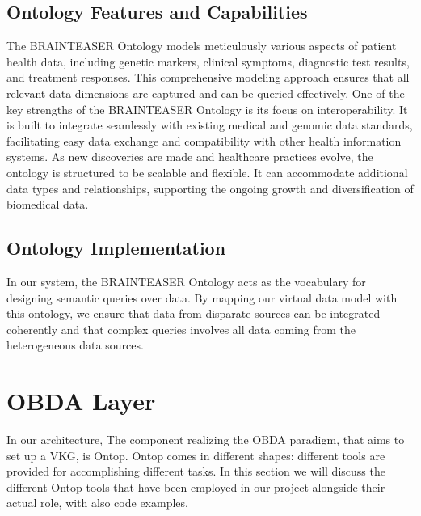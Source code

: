 \subsection{Ontology Features and Capabilities}
The \ac{BRAINTEASER} Ontology models meticulously various aspects of patient health data, including genetic markers, clinical symptoms, diagnostic test results, and treatment responses. This comprehensive modeling approach ensures that all relevant data dimensions are captured and can be queried effectively. One of the key strengths of the \ac{BRAINTEASER} Ontology is its focus on interoperability. It is built to integrate seamlessly with existing medical and genomic data standards, facilitating easy data exchange and compatibility with other health information systems. As new discoveries are made and healthcare practices evolve, the ontology is structured to be scalable and flexible. It can accommodate additional data types and relationships, supporting the ongoing growth and diversification of biomedical data.
\subsection{Ontology Implementation}
In our system, the \ac{BRAINTEASER} Ontology acts as the vocabulary for designing semantic queries over data. By mapping our virtual data model with this ontology, we ensure that data from disparate sources can be integrated coherently and that complex queries involves all data coming from the heterogeneous data sources.

\section{OBDA Layer}
In our architecture, The component realizing the \ac{OBDA} paradigm, that aims to set up a \ac{VKG}, is Ontop.
Ontop comes in different shapes: different tools are provided for accomplishing different tasks.
In this section we will discuss the different Ontop tools that have been employed in our project alongside their actual role, with also code examples.
